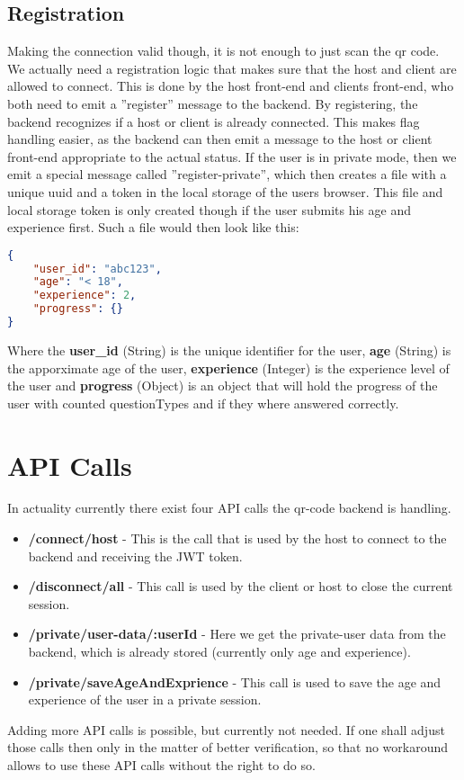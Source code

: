\subsection{Registration}
Making the connection valid though, it is not enough to just scan the qr code.
We actually need a registration logic that makes sure that the host and client are allowed to connect.
This is done by the host front-end and clients front-end, who both need to emit a ''register'' message to the backend.
By registering, the backend recognizes if a host or client is already connected.
This makes flag handling easier, as the backend can then emit a message to the host or client front-end appropriate to the actual status.
If the user is in private mode, then we emit a special message called ''register-private'', 
which then creates a file with a unique uuid and a token in the local storage of the users browser.
This file and local storage token is only created though if the user submits his age and experience first.
Such a file would then look like this:
\begin{lstlisting}[language=json,firstnumber=1]
{
    "user_id": "abc123",
    "age": "< 18",
    "experience": 2,
    "progress": {}
}
\end{lstlisting}
Where the \textbf{user\_id} (String) is the unique identifier for the user, 
\textbf{age} (String) is the apporximate age of the user, 
\textbf{experience} (Integer) is the experience level of the user and 
\textbf{progress} (Object) is an object that will hold the progress of the user with counted questionTypes and if they where answered correctly.

\section{API Calls}
In actuality currently there exist four API calls the qr-code backend is handling.
\begin{itemize}
    \item \textbf{/connect/host} - This is the call that is used by the host to connect to the backend and receiving the JWT token.
    \item \textbf{/disconnect/all} - This call is used by the client or host to close the current session.
    \item \textbf{/private/user-data/:userId} - Here we get the private-user data from the backend, which is already stored (currently only age and experience).
    \item \textbf{/private/saveAgeAndExprience} - This call is used to save the age and experience of the user in a private session.
\end{itemize}
Adding more API calls is possible, but currently not needed.
If one shall adjust those calls then only in the matter of better verification, so that no workaround allows to use these API calls without the right to do so.